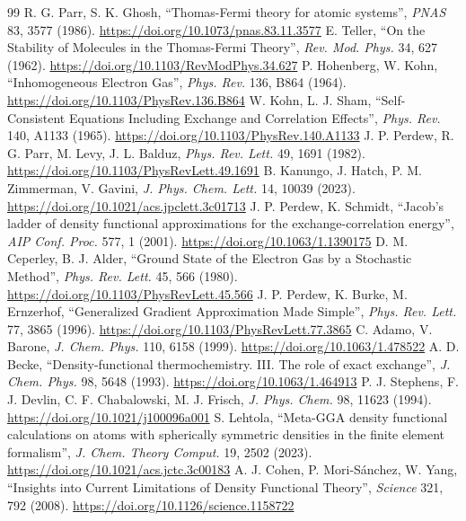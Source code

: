 {\begin{thebibliography}{99}
 R. G. Parr, S. K. Ghosh, ``Thomas-Fermi theory for atomic systems'', \emph{PNAS} 83, 3577 (1986). \url{https://doi.org/10.1073/pnas.83.11.3577}
 E. Teller, ``On the Stability of Molecules in the Thomas-Fermi Theory'', \emph{Rev. Mod. Phys.} 34, 627 (1962). \url{https://doi.org/10.1103/RevModPhys.34.627}
 P. Hohenberg, W. Kohn, ``Inhomogeneous Electron Gas'', \emph{Phys. Rev.} 136, B864 (1964). \url{https://doi.org/10.1103/PhysRev.136.B864}
 W. Kohn, L. J. Sham, ``Self-Consistent Equations Including Exchange and Correlation Effects'', \emph{Phys. Rev.} 140, A1133 (1965). \url{https://doi.org/10.1103/PhysRev.140.A1133}
 J. P. Perdew, R. G. Parr, M. Levy, J. L. Balduz, \emph{Phys. Rev. Lett.} 49, 1691 (1982). \url{https://doi.org/10.1103/PhysRevLett.49.1691}
 B. Kanungo, J. Hatch, P. M. Zimmerman, V. Gavini, \emph{J. Phys. Chem. Lett.} 14, 10039 (2023). \url{https://doi.org/10.1021/acs.jpclett.3c01713}
 J. P. Perdew, K. Schmidt, ``Jacob's ladder of density functional approximations for the exchange-correlation energy'', \emph{AIP Conf. Proc.} 577, 1 (2001). \url{https://doi.org/10.1063/1.1390175}
 D. M. Ceperley, B. J. Alder, ``Ground State of the Electron Gas by a Stochastic Method'', \emph{Phys. Rev. Lett.} 45, 566 (1980). \url{https://doi.org/10.1103/PhysRevLett.45.566}
 J. P. Perdew, K. Burke, M. Ernzerhof, ``Generalized Gradient Approximation Made Simple'', \emph{Phys. Rev. Lett.} 77, 3865 (1996). \url{https://doi.org/10.1103/PhysRevLett.77.3865}
 C. Adamo, V. Barone, \emph{J. Chem. Phys.} 110, 6158 (1999). \url{https://doi.org/10.1063/1.478522}
 A. D. Becke, ``Density-functional thermochemistry. III. The role of exact exchange'', \emph{J. Chem. Phys.} 98, 5648 (1993). \url{https://doi.org/10.1063/1.464913}
 P. J. Stephens, F. J. Devlin, C. F. Chabalowski, M. J. Frisch, \emph{J. Phys. Chem.} 98, 11623 (1994). \url{https://doi.org/10.1021/j100096a001}
 S. Lehtola, ``Meta-GGA density functional calculations on atoms with spherically symmetric densities in the finite element formalism'', \emph{J. Chem. Theory Comput.} 19, 2502 (2023). \url{https://doi.org/10.1021/acs.jctc.3c00183}
 A. J. Cohen, P. Mori-Sánchez, W. Yang, ``Insights into Current Limitations of Density Functional Theory'', \emph{Science} 321, 792 (2008). \url{https://doi.org/10.1126/science.1158722}

\end{thebibliography}}
